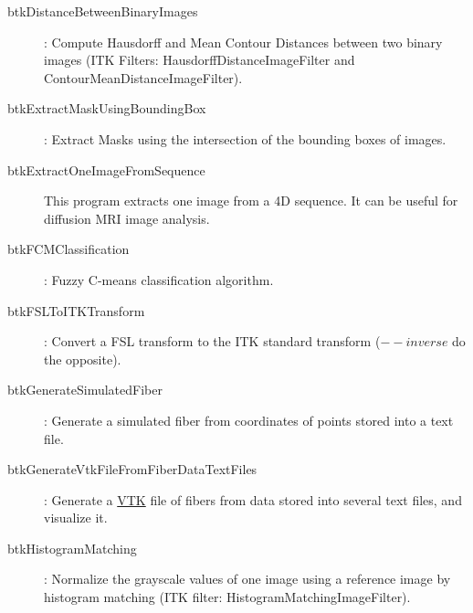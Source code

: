 \begin{description}
\item[btkDistanceBetweenBinaryImages]: Compute Hausdorff and Mean Contour Distances between two binary images (ITK Filters: HausdorffDistanceImageFilter and ContourMeanDistanceImageFilter).
\item[btkExtractMaskUsingBoundingBox]: Extract Masks using the intersection of the bounding boxes of images.
\item[btkExtractOneImageFromSequence] This program extracts one image from a 4D sequence. It can be useful for diffusion MRI image analysis. 
\item[btkFCMClassification]: Fuzzy C-means classification algorithm.
\item[btkFSLToITKTransform]: Convert a FSL transform to the ITK standard transform ($--inverse$ do the opposite).
\item[btkGenerateSimulatedFiber]: Generate a simulated fiber from coordinates of points stored into a text file. 
\item[btkGenerateVtkFileFromFiberDataTextFiles]: Generate a \href{www.vtk.org/VTK/img/file-formats.pdf}{VTK} file of fibers from data stored into several text files, and visualize it.
\item[btkHistogramMatching]: Normalize the grayscale values of one image using a reference image by histogram matching (ITK filter: HistogramMatchingImageFilter).

\end{description}

